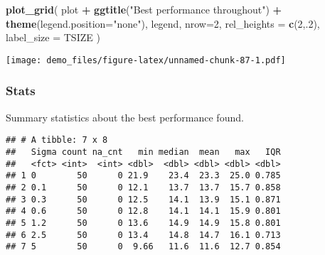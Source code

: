 \documentclass[]{book}
\newenvironment{Shaded}{\begin{snugshade}}{\end{snugshade}}
\newcommand{\DataTypeTok}[1]{\textcolor[rgb]{0.13,0.29,0.53}{#1}}
\newcommand{\DecValTok}[1]{\textcolor[rgb]{0.00,0.00,0.81}{#1}}
\newcommand{\KeywordTok}[1]{\textcolor[rgb]{0.13,0.29,0.53}{\textbf{#1}}}
\newcommand{\NormalTok}[1]{#1}
\newcommand{\OperatorTok}[1]{\textcolor[rgb]{0.81,0.36,0.00}{\textbf{#1}}}
\newcommand{\OtherTok}[1]{\textcolor[rgb]{0.56,0.35,0.01}{#1}}
\newcommand{\StringTok}[1]{\textcolor[rgb]{0.31,0.60,0.02}{#1}}
\begin{document}
\begin{Shaded}
\begin{Highlighting}[]
\KeywordTok{plot_grid}\NormalTok{(}
\NormalTok{  plot }\OperatorTok{+}
\StringTok{    }\KeywordTok{ggtitle}\NormalTok{(}\StringTok{"Best performance throughout"}\NormalTok{) }\OperatorTok{+}
\StringTok{    }\KeywordTok{theme}\NormalTok{(}\DataTypeTok{legend.position=}\StringTok{"none"}\NormalTok{),}
\NormalTok{  legend,}
  \DataTypeTok{nrow=}\DecValTok{2}\NormalTok{,}
  \DataTypeTok{rel_heights =} \KeywordTok{c}\NormalTok{(}\DecValTok{2}\NormalTok{,.}\DecValTok{2}\NormalTok{),}
  \DataTypeTok{label_size =}\NormalTok{ TSIZE}
\NormalTok{)}
\end{Highlighting}
\end{Shaded}

\texttt{[image: demo\_files/figure-latex/unnamed-chunk-87-1.pdf]}

\hypertarget{stats-54}{%
\subsubsection{Stats}\label{stats-54}}

Summary statistics about the best performance found.

\begin{Shaded}
\end{Shaded}

\begin{verbatim}
## # A tibble: 7 x 8
##   Sigma count na_cnt   min median  mean   max   IQR
##   <fct> <int>  <int> <dbl>  <dbl> <dbl> <dbl> <dbl>
## 1 0        50      0 21.9    23.4  23.3  25.0 0.785
## 2 0.1      50      0 12.1    13.7  13.7  15.7 0.858
## 3 0.3      50      0 12.5    14.1  13.9  15.1 0.871
## 4 0.6      50      0 12.8    14.1  14.1  15.9 0.801
## 5 1.2      50      0 13.6    14.9  14.9  15.8 0.801
## 6 2.5      50      0 13.4    14.8  14.7  16.1 0.713
## 7 5        50      0  9.66   11.6  11.6  12.7 0.854
\end{verbatim}
\end{document}
